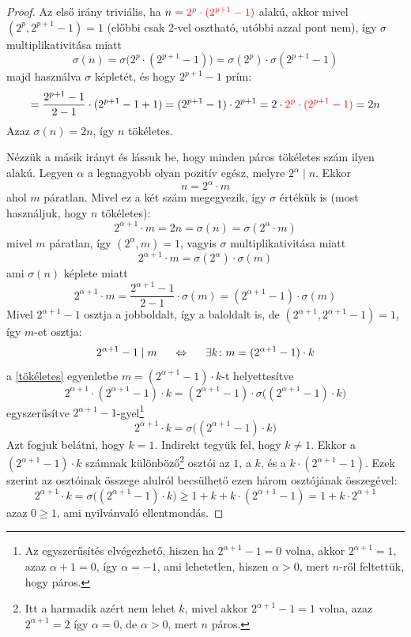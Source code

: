 \documentclass[12pt]{book}
\theoremstyle{plain} %
\theoremstyle{definition} %
\theoremstyle{remark}
\numberwithin{equation}{section}  %
\begin{document}
	\begin{proof}
		Az első irány triviális, ha $n= \color{red} 2^p\cdot (2^{p+1}-1) \color{black}$ alakú, akkor mivel $(2^p,2^{p+1}-1)=1$ (előbbi csak $2$-vel osztható, utóbbi azzal pont nem), így $\sigma$ multiplikativitása miatt
		\[ \sigma(n) = \sigma\Big(2^p\cdot (2^{p+1} - 1)\Big) = \sigma(2^p)\cdot \sigma(2^{p+1}-1)  \]
		majd használva $\sigma$ képletét, és hogy $2^{p+1}-1$ prím:
		\[ = \dfrac{2^{p+1}-1}{2-1} \cdot (2^{p+1}-1+1)  = (2^{p+1}-1) \cdot 2^{p+1} = 2\cdot \color{red} 2^p \cdot  (2^{p+1}-1) \color{black} = 2n  \]
		Azaz $\sigma(n) = 2n$, így $n$ tökéletes.
		
		Nézzük a másik irányt és lássuk be, hogy minden páros tökéletes szám ilyen alakú. Legyen $\alpha$ a legnagyobb olyan pozitív egész, melyre $2^{\alpha}\mid n$. Ekkor
		\[ n = 2^{\alpha} \cdot m \]
		ahol $m$ páratlan. Mivel ez a két szám megegyezik, így $\sigma$ értékük is (most használjuk, hogy $n$ tökéletes):
		\[ 2^{\alpha+1}\cdot m = 2n = \sigma(n) = \sigma(2^{\alpha} \cdot m)  \]
		mivel $m$ páratlan, így $(2^\alpha, m) = 1$, vagyis $\sigma$ multiplikativitása miatt
		\[ 2^{\alpha+1}\cdot m = \sigma(2^{\alpha}) \cdot \sigma(m)  \]
		ami $\sigma(n)$ képlete miatt
		\begin{equation}\label{tökéletes}
			2^{\alpha+1}\cdot m = \dfrac{2^{\alpha+1} - 1}{2-1} \cdot \sigma(m) = (2^{\alpha+1}-1) \cdot \sigma(m) 
		\end{equation}
		Mivel $2^{\alpha+1} - 1$ osztja a jobboldalt, így a baloldalt is, de $(2^{\alpha+1},2^{\alpha+1}-1) = 1$, így $m$-et osztja:
		\[ 2^{\alpha+1}-1\mid m \hspace{5mm} \Leftrightarrow \hspace{5mm} \exists k\colon m = (2^{\alpha+1}-1)\cdot k  \]
		a \ref{tökéletes} egyenletbe $m=(2^{\alpha+1}-1)\cdot k$-t helyettesítve
		\[ 2^{\alpha+1}\cdot (2^{\alpha+1}-1)\cdot k   = (2^{\alpha+1}-1) \cdot \sigma\Big((2^{\alpha+1}-1)\cdot k\Big) \]
		egyszerűsítve $2^{\alpha+1}-1$-gyel\footnote{Az egyszerűsítés elvégezhető, hiszen ha $2^{\alpha+1}-1 = 0$ volna, akkor $2^{\alpha+1} = 1$, azaz $\alpha+1 = 0$, így $\alpha = -1$, ami lehetetlen, hiszen $\alpha > 0$, mert $n$-ről feltettük, hogy páros.}
		\begin{equation}\label{sigma}
			2^{\alpha+1} \cdot k = \sigma\Big((2^{\alpha+1}-1)\cdot k\Big)
		\end{equation}
		Azt fogjuk belátni, hogy $k=1$. Indirekt tegyük fel, hogy $k\neq 1$. Ekkor a $(2^{\alpha+1}-1)\cdot k$ számnak különböző\footnote{Itt a harmadik azért nem lehet $k$, mivel akkor $2^{\alpha+1}-1 = 1$ volna, azaz $2^{\alpha+1} = 2$ így $\alpha = 0$, de $\alpha > 0$, mert $n$ páros.} osztói az $1$, a $k$, és a $k\cdot(2^{\alpha+1}-1)$. Ezek szerint az osztóinak összege alulról becsülhető ezen három osztójának összegével:
		\[ 2^{\alpha+1} \cdot k = \sigma\Big( (2^{\alpha+1}-1)\cdot k \Big) \geq 1+k+k\cdot (2^{\alpha+1}-1) = 1 + k\cdot 2^{\alpha+1}  \]
		azaz $0\geq 1$, ami nyilvánvaló ellentmondás.
		

\end{proof}
\end{document}
